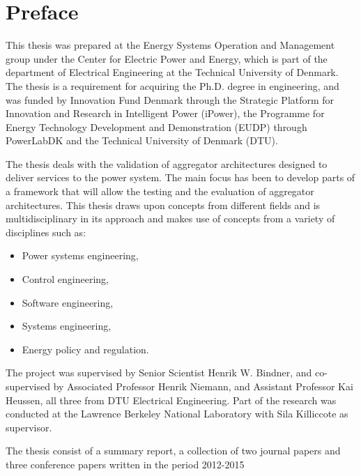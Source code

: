 \chapter{Preface}
This thesis was prepared at the Energy Systems Operation and Management group under the Center for Electric Power and Energy, which is part of the department of Electrical Engineering at the Technical University of Denmark. The thesis is a requirement for acquiring the Ph.D. degree in engineering, and was funded by Innovation Fund Denmark through the Strategic Platform for Innovation and Research in Intelligent Power (iPower), the Programme for Energy Technology Development and Demonstration (EUDP) through PowerLabDK and the Technical University of Denmark (DTU).

The thesis deals with the validation of aggregator architectures designed to deliver services to the power system. The main focus has been to develop parts of a framework that will allow the testing and the evaluation of aggregator architectures.
This thesis draws upon concepts from different fields and is multidisciplinary in its approach and makes use of concepts from a variety of disciplines such as:
\begin{itemize}
	\item Power systems engineering,
	\item Control engineering,
	\item Software engineering,
	\item Systems engineering,
	\item Energy policy and regulation.
\end{itemize}

The project was supervised by Senior Scientist Henrik W. Bindner, and co-supervised by Associated Professor Henrik Niemann, and Assistant Professor Kai Heussen, all three from DTU Electrical Engineering. Part of the research was conducted at the Lawrence Berkeley National Laboratory with Sila Killiccote as supervisor.

The thesis consist of a summary report, a collection of two journal papers and three conference papers written in the period 2012-2015
\vfill

{
\centering
\begin{flushright}
    \thesisauthor{}
\end{flushright}
}
